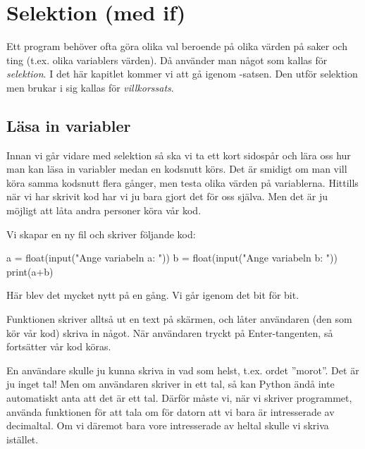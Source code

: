 %
%

\chapter{Selektion (med if)}\label{ch:selektion}
Ett program behöver ofta göra olika val beroende på olika värden på saker och ting (t.ex. olika variablers värden). Då använder man något som kallas för \emph{selektion}. I det här kapitlet kommer vi att gå igenom -satsen. Den utför selektion men brukar i sig kallas för \emph{villkorssats}.


\section{Läsa in variabler}
Innan vi går vidare med selektion så ska vi ta ett kort sidospår och lära oss hur man kan läsa in variabler medan en kodsnutt körs. Det är smidigt om man vill köra samma kodsnutt flera gånger, men testa olika värden på variablerna. Hittills när vi har skrivit kod har vi ju bara gjort det för oss själva. Men det är ju möjligt att låta andra personer köra vår kod.

Vi skapar en ny fil och skriver följande kod:

\begin{python}[caption={Läsa in variabler},label={}]
a = float(input("Ange variabeln a: "))
b = float(input("Ange variabeln b: "))
print(a+b)
\end{python}

Här blev det mycket nytt på en gång. Vi går igenom det bit för bit.

Funktionen  skriver alltså ut en text på skärmen, och låter användaren (den som kör vår kod) skriva in något. När användaren tryckt på Enter-tangenten, så fortsätter vår kod köras.

En användare skulle ju kunna skriva in vad som helst, t.ex. ordet ''morot''. Det är ju inget tal! Men om användaren skriver in ett tal, så kan Python ändå inte automatiskt anta att det är ett tal. Därför måste vi, när vi skriver programmet, använda funktionen  för att tala om för datorn att vi bara är intresserade av decimaltal. Om vi däremot bara vore intresserade av heltal skulle vi skriva  istället.


